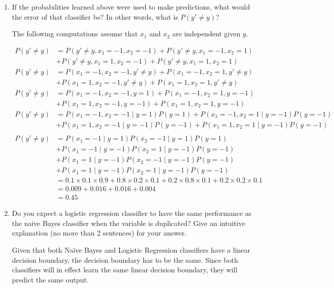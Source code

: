 \begin{enumerate}
\begin{enumerate}
  \item \relax[3 points] If the probabilities learned above were used to
    make predictions, what would the error of that classifier be? In
    other words, what is $P(y' \ne y)$?

The following computations assume that $x_1$ and $x_2$ are independent given $y$.

\begin{equation*}
\begin{aligned}
P(y' \ne y) &= P(y' \ne y, x_1 = -1, x_2=-1) + P(y' \ne y, x_1 = -1, x_2=1) \\&+ P(y' \ne y, x_1 = 1, x_2=-1) + P(y' \ne y, x_1 = 1, x_2=1) \\
P(y' \ne y) &= P(x_1 = -1, x_2=-1, y' \ne y) + P(x_1 = -1, x_2=1,y' \ne y) \\&+ P(x_1 = 1, x_2=-1,y' \ne y) + P(x_1 = 1, x_2=1,y' \ne y) \\
P(y' \ne y) &= P(x_1 = -1, x_2=-1, y=1) + P(x_1 = -1, x_2=1,y=-1) \\&+ P(x_1 = 1, x_2=-1,y=-1) + P(x_1 = 1, x_2=1,y=-1) \\
P(y' \ne y) &= P(x_1 = -1, x_2=-1 \mid y=1) P(y=1)+ P(x_1 = -1, x_2=1 \mid y=-1) P(y=-1) \\&+ P(x_1 = 1, x_2=-1 \mid y=-1) P(y=-1) + P(x_1 = 1, x_2=1 \mid y=-1) P(y=-1) \\
\end{aligned}
\end{equation*} 
\begin{equation*}
\begin{aligned}
P(y' \ne y) &= P(x_1 = -1 \mid y=1) P(x_2=-1 \mid y=1)P(y=1)\\&+ P(x_1 = -1 \mid y=-1) P(x_2=1 \mid y=-1)P(y=-1) \\&+ P(x_1 = 1 \mid y=-1)P(x_2=-1 \mid y=-1) P(y=-1)\\&+ P(x_1 = 1 \mid y=-1) P( x_2=1 \mid y=-1)P(y=-1) \\
&= 0.1 \times 0.1 \times 0.9 + 0.8 \times 0.2 \times 0.1 + 0.2 \times 0.8  \times 0.1+ 0.2 \times 0.2 \times 0.1\\
&= 0.009 + 0.016 + 0.016 + 0.004\\
&= 0.45
\end{aligned}
\end{equation*} 


  \item \relax[2 points] Do you expect a logistic regression
    classifier to have the same performance as the naive Bayes
    classifier when the variable is duplicated? Give an intuitive
    explanation (no more than 2 sentences) for your answer.

Given that both Na\"ive Bayes and Logistic Regression classifiers have a linear decision boundary, the decision boundary has to be the same. Since both classifiers will in effect learn the same linear decision boundary, they will predict the same output.
  \end{enumerate}

\end{enumerate}





